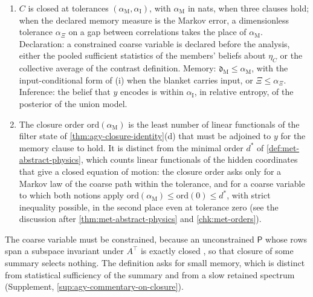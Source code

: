 \begin{definition}[Closure]
\begin{enumerate}
\item[(ii)] $C$ is closed at tolerances $(\alpha_{\mathrm M},\alpha_{\mathrm I})$, with $\alpha_{\mathrm M}$ in nats, when three clauses hold; when the declared memory measure is the Markov error, a dimensionless tolerance $\alpha_\Xi$ on a gap between correlations takes the place of $\alpha_{\mathrm M}$. Declaration: a constrained coarse variable is declared before the analysis, either the pooled sufficient statistics of the members' beliefs about $\eta_C$ or the collective average of the contrast definition. Memory: $\mathfrak d_{\mathrm M}\le\alpha_{\mathrm M}$, with the input-conditional form of (i) when the blanket carries input, or $\Xi\le\alpha_\Xi$. Inference: the belief that $y$ encodes is within $\alpha_{\mathrm I}$, in relative entropy, of the posterior of the union model.
\item[(iii)] The closure order $\mathrm{ord}(\alpha_{\mathrm M})$ is the least number of linear functionals of the filter state of \cref{thm:agy-closure-identity}(d) that must be adjoined to $y$ for the memory clause to hold. It is distinct from the minimal order $d^\ast$ of \cref{def:met-abstract-physics}, which counts linear functionals of the hidden coordinates that give a closed equation of motion: the closure order asks only for a Markov law of the coarse path within the tolerance, and for a coarse variable to which both notions apply $\mathrm{ord}(\alpha_{\mathrm M})\le\mathrm{ord}(0)\le d^\ast$, with strict inequality possible, in the second place even at tolerance zero (see the discussion after \cref{thm:met-abstract-physics} and \cref{chk:met-orders}).
\end{enumerate}
\end{definition}

The coarse variable must be constrained, because an unconstrained $\mathsf P$ whose rows span a subspace invariant under $A^\top$ is exactly closed \citep{dennis2026communicating}, so that closure of some summary selects nothing. The definition asks for small memory, which is distinct from statistical sufficiency of the summary and from a slow retained spectrum (Supplement, \cref{sup:agy-commentary-on-closure}).

